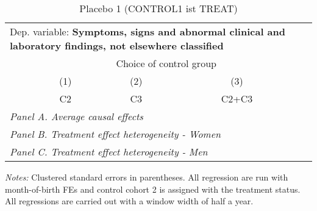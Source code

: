 \begin{table}[H] \centering \begin{threeparttable} \caption{Placebo 1 (CONTROL1 ist TREAT) } {\def\sym#1{\ifmmode^{#1}\else\(^{#1}\)\fi} \begin{tabular}{l*{4}{c}} \toprule \multicolumn{4}{l}{Dep. variable: \textbf{Symptoms, signs and abnormal clinical and laboratory findings, not elsewhere classified}} \\ & \multicolumn{3}{c}{Choice of control group} \\ \cmidrule(lr){2-4}
            &\multicolumn{1}{c}{(1)}&\multicolumn{1}{c}{(2)}&\multicolumn{1}{c}{(3)}\\
            &\multicolumn{1}{c}{C2}&\multicolumn{1}{c}{C3}&\multicolumn{1}{c}{C2+C3}\\
\midrule
 \multicolumn{4}{l}{\emph{Panel A. Average causal effects}} \\      \midrule\multicolumn{4}{l}{\emph{Panel B. Treatment effect heterogeneity - Women}} \\      \midrule\multicolumn{4}{l}{\emph{Panel C. Treatment effect heterogeneity - Men}} \\      
\bottomrule \end{tabular} } \begin{tablenotes} \item \scriptsize \emph{Notes:} Clustered standard errors in parentheses. All regression are run with month-of-birth FEs and control cohort 2 is assigned with the treatment status. All regressions are carried out with a window width of half a year. \end{tablenotes} \end{threeparttable} \end{table} 
